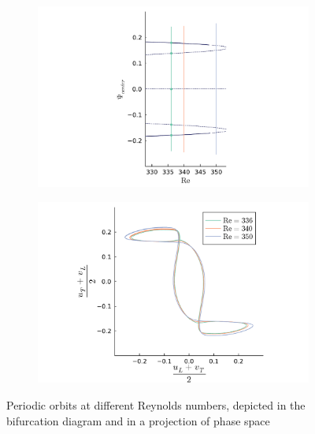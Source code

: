 \begin{figure}[ht]
  \begin{subfigure}[b]{0.42\textwidth}
  \centering
  \includegraphics[trim={3cm 0 4.6cm 0},clip,width=\textwidth]{figs/orbits_bif_diag64x64.pdf}
  \end{subfigure}
  \begin{subfigure}[b]{0.58\textwidth}
  \centering
  \includegraphics[trim={1cm 0cm 1cm 0cm},clip,width=\textwidth]{figs/orbits64x64.pdf}
  \end{subfigure}
  \caption{Periodic orbits at different Reynolds numbers, depicted in the
    bifurcation diagram and in a projection of phase space} 
  \label{fig:orbit_bif_diag}
\end{figure}

